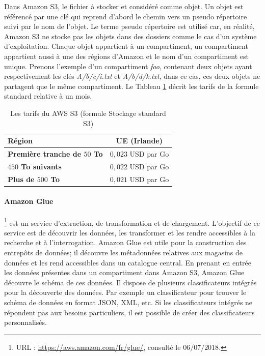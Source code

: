 Dans Amazon S3, le fichier à stocker et considéré comme objet. Un objet est référencé par une clé qui reprend d'abord le chemin vers un pseudo répertoire suivi par  le nom de l'objet.  Le terme pseudo répertoire est utilisé car, en réalité, Amazon S3 ne stocke pas les objets dans des dossiers comme le cas d'un système d'exploitation. Chaque objet appartient à un compartiment, un compartiment appartient aussi à une des régions d'Amazon et le nom d'un compartiment est unique. Prenons l'exemple d'un  compartiment \textit{foo}, contenant deux objets ayant respectivement les clés \textit{A/b/c/i.txt} et \textit{A/b/d/k.txt}, dans ce cas, ces deux objets ne partagent que le même compartiment.
Le Tableau   	\ref{tab:pricing-s3-standard} décrit les tarifs de la formule standard relative à un mois.
\begin{table}[H]
	\centering
	\captionsetup{justification=centering}
	\begin{tabular}{l c }
		\textbf{Région} & UE (Irlande) \\ \hline
		\textbf{Première tranche de $ 50 $ To} &	$ 0,023 $ USD par Go\\ \hline
		\textbf{$ 450 $ To suivants} &	$ 0,022 $ USD par Go \\ \hline
		\textbf{Plus de $ 500 $ To} &	$ 0,021 $ USD par Go\\ \hline
	\end{tabular}
	\caption{Les tarifs du AWS S3 (formule Stockage standard S3)}
	\label{tab:pricing-s3-standard}
\end{table}


\paragraph{Amazon  Glue} \label{aws:glue}
\footnote{URL : \url{https://aws.amazon.com/fr/glue/}, consulté le $06/07/2018$.} est un service d'extraction, de transformation et de chargement. L'objectif de ce service est de découvrir les données, les transformer et les rendre accessibles à la recherche et à l'interrogation.  Amazon Glue  est utile pour la construction des entrepôts de données; il découvre les métadonnées relatives aux magasins de données et les rend accessibles dans un catalogue central. En prenant en entrée les données  présentes dans un compartiment dans Amazon S3, Amazon Glue découvre le schéma de ces données. Il dispose de plusieurs classificateurs intégrés pour la découverte des données. Par exemple un classificateur pour trouver le schéma  de données en format JSON, XML, etc. Si les classificateurs intégrés ne répondent pas aux besoins particuliers, il est possible de créer des classificateurs personnalisés. 

